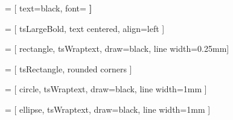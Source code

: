 %
 = [ 
    text=black, 
    font=\bfseries\large
]

 = [ 
    tsLargeBold, 
    text centered, 
    align=left
]

 = [ 
    rectangle,
    tsWraptext,               
    draw=black,
    line width=0.25mm]

 = [  
    tsRectangle,
    rounded corners
]

 = [   
        circle,
        tsWraptext,
        draw=black,
        line width=1mm
    ]

 = [   
    ellipse,
    tsWraptext,
    draw=black,
    line width=1mm
]

%
\newcommand{\instructionentry}[2]{%
  \noindent
  \begin{minipage}[t]{0.22\textwidth}
    \textbf{\large\textcolor{blue}{#1}}%
  \end{minipage}%
  \hfill
  \begin{minipage}[t]{0.74\textwidth}
    #2
  \end{minipage}\par\vspace{0.75em}
}

